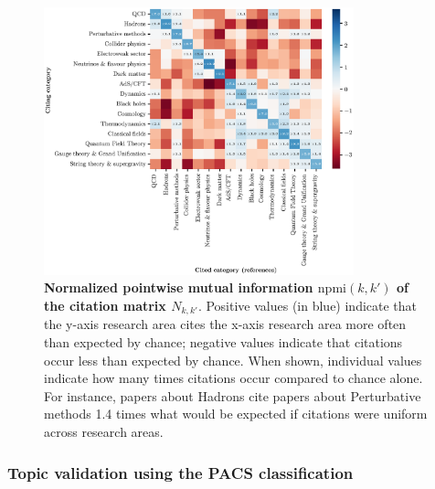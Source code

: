 \documentclass{article}
\begin{document}
\begin{figure}[H]
    \centering
    \includegraphics[width=0.8\textwidth]{plots/Fig10.eps}
    \caption{\textbf{Normalized pointwise mutual information $\mathrm{npmi}(k,k')$ of the citation matrix $N_{k,k'}$}. Positive values (in blue) indicate that the y-axis research area cites the x-axis research area more often than expected by chance; negative values indicate that citations occur less than expected by chance. When shown, individual values indicate how many times citations occur compared to chance alone. For instance, papers about Hadrons cite papers about Perturbative methods 1.4 times what would be expected if citations were uniform across research areas.}
    \label{fig:topic_citation_matrix}
\end{figure}

\subsubsection{\label{appendix:pacs_validation}Topic validation using the PACS classification}
\end{document}
